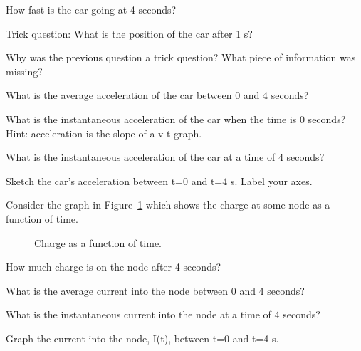 \begin{alevel}
How fast is the car going at 4 seconds?
\end{alevel}

\begin{blevel}
Trick question: What is the position of the car after 1 s?
\end{blevel}

\begin{dlevel}
Why was the previous question a trick question? What piece of information was missing?
\end{dlevel}

\begin{blevel}
What is the average acceleration of the car between 0 and 4 seconds?
\end{blevel}

\begin{blevel}
What is the instantaneous acceleration of the car when the time is 0 seconds? Hint: acceleration is the slope of a v-t graph.
\end{blevel}

\begin{blevel}
What is the instantaneous acceleration of the car at a time of 4 seconds?
\end{blevel}
\begin{clevel}
Sketch the car's acceleration between t=0 and t=4 s. Label your axes.
\end{clevel}
\noindent
Consider the graph in Figure~\ref{F:2QT} which shows the charge at some node as a function of time.
\par
\begin{figure}[H]
\begin{center}
\caption{Charge as a function of time.}
\label{F:2QT}
\end{center}
\end{figure}

\begin{alevel}
How much charge is on the node after 4 seconds?
\end{alevel}
\begin{blevel}
What is the average current into the node between 0 and 4 seconds?
\end{blevel}
\begin{blevel}
What is the instantaneous current into the node at a time of 4 seconds?
\end{blevel}
\begin{clevel}
Graph the current into the node, I(t), between t=0 and t=4 s.
\end{clevel}

